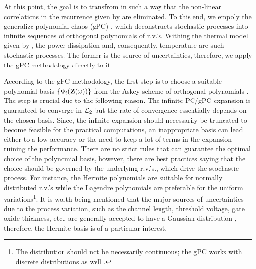 At this point, the goal is to transfrom  in such a way that the non-linear correlations in the recurrence given by  are eliminated. To this end, we empoly the generalize polynomial chaos (gPC) \cite{xiu2002}, which deconstructs stochastic processes into infinite sequences of orthogonal polynomials of r.v.'s. Withing the thermal model given by , the power dissipation and, consequently, temperature are such stochastic processes. The former is the source of uncertainties, therefore, we apply the gPC methodology directly to it.

According to the gPC methodology, the first step is to choose a suitable polynomial basis $\{ \Phi_i(\mathbf{Z}(\omega)) \}$ from the Askey scheme of orthogonal polynomials \cite{xiu2002}. The step is crucial due to the following reason. The infinite PC/gPC expansion is guaranteed to converge in $\mathcal{L}_{2}$ but the rate of convergence essentially depends on the chosen basis. Since, the infinite expansion should necessarily be truncated to become feasible for the practical computations, an inappropriate basis can lead either to a low accuracy or the need to keep a lot of terms in the expansion ruining the performance. There are no strict rules that can guarantee the optimal choice of the polynomial basis, however, there are best practices saying that the choice should be governed by the underlying r.v.'s., which drive the stochastic process. For instance, the Hermite polynomials are suitable for normally distributed r.v.'s while the Lagendre polynomials are preferable for the uniform variations\footnote{The distribution should not be necessarily continuous; the gPC works with discrete distributions as well \cite{xiu2002}.}. It is worth being mentioned that the major sources of uncertainties due to the process variation, such as the channel length, threshold voltage, gate oxide thickness, etc., are generally accepted to have a Gaussian distribution \cite{srivastava2010, liu2007, juan2012}, therefore, the Hermite basis is of a particular interest.

